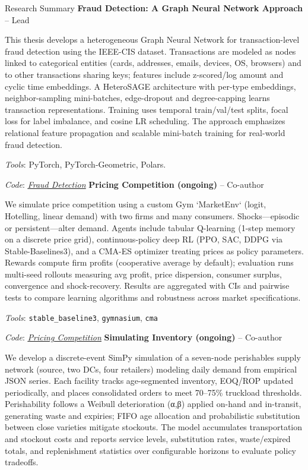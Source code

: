 
\begin{rubric}{Research Summary}
\entry*[]
    \textbf{Fraud Detection: A Graph Neural Network Approach} -- Lead
    \par This thesis develops a heterogeneous Graph Neural Network for transaction-level fraud detection using the IEEE-CIS dataset. Transactions are modeled as nodes linked to categorical entities (cards, addresses, emails, devices, OS, browsers) and to other transactions sharing keys; features include z-scored/log amount and cyclic time embeddings. A HeteroSAGE architecture with per-type embeddings, neighbor-sampling mini-batches, edge-dropout and degree-capping learns transaction representations. Training uses temporal train/val/test splits, focal loss for label imbalance, and cosine LR scheduling. The approach emphasizes relational feature propagation and scalable mini-batch training for real-world fraud detection.
    \vspace{0.25cm}
    \par \emph{Tools}: PyTorch, PyTorch-Geometric, Polars.
    \par \emph{Code}: \href{https://www.kaggle.com/code/aheersrabon/fraud-detection-ieee-cis}{\emph{\underline{Fraud Detection}}}
\entry*[]
    \textbf{Pricing Competition (ongoing)} -- Co-author
    \par We simulate price competition using a custom Gym `MarketEnv` (logit, Hotelling, linear demand) with two firms and many consumers. Shocks—episodic or persistent—alter demand. Agents include tabular Q-learning (1-step memory on a discrete price grid), continuous-policy deep RL (PPO, SAC, DDPG via Stable-Baselines3), and a CMA-ES optimizer treating prices as policy parameters. Rewards compute firm profits (cooperative average by default); evaluation runs multi-seed rollouts measuring avg profit, price dispersion, consumer surplus, convergence and shock-recovery. Results are aggregated with CIs and pairwise tests to compare learning algorithms and robustness across market specifications.
    \vspace{0.25cm}
    \par \emph{Tools}: \verb|stable_baseline3|, \verb|gymnasium|, \verb|cma|
    \par \emph{Code}: \href{https://www.kaggle.com/code/aheersrabon/pricing-competiton-1}{\emph{\underline{Pricing Competition}}}
\entry*[]
    \textbf{Simulating Inventory (ongoing)} -- Co-author
	\par We develop a discrete-event SimPy simulation of a seven-node perishables supply network (source, two DCs, four retailers) modeling daily demand from empirical JSON series. Each facility tracks age-segmented inventory, EOQ/ROP updated periodically, and places consolidated orders to meet 70–75\% truckload thresholds. Perishability follows a Weibull deterioration (α,β) applied on-hand and in-transit, generating waste and expiries; FIFO age allocation and probabilistic substitution between close varieties mitigate stockouts. The model accumulates transportation and stockout costs and reports service levels, substitution rates, waste/expired totals, and replenishment statistics over configurable horizons to evaluate policy tradeoffs.

\end{rubric}

